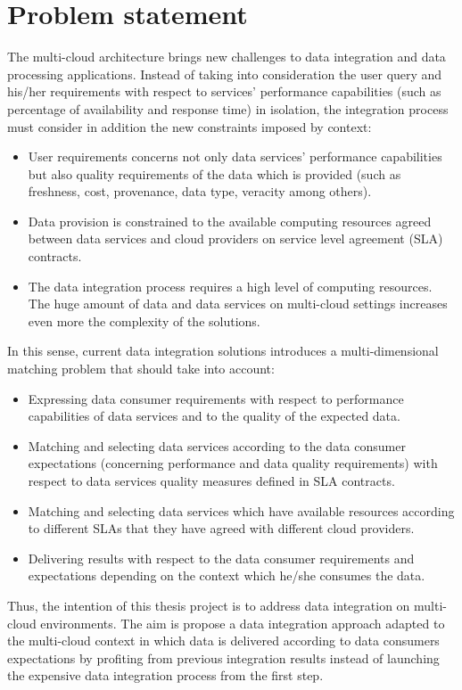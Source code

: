 \section{Problem statement}
%
The multi-cloud architecture brings new challenges to data integration
and data processing applications.
%
Instead of taking into consideration the user query and his/her requirements
with respect to services' performance capabilities (such as percentage of 
availability and response time) in isolation, the integration process 
must consider in addition the new constraints imposed by context: 
%
\begin{itemize}
\renewcommand{\labelitemi}{$-$}
\item User requirements concerns not only data services' performance 
capabilities but also quality requirements of the data which is provided
(such as freshness, cost, provenance, data type, veracity among others).
%
\item Data provision is constrained to the available computing resources agreed
between data services and cloud providers on service level agreement (SLA) contracts. 
%
\item The data integration process requires a high level of computing resources.
The huge amount of data and data services on multi-cloud settings increases even 
more the complexity of the solutions.
\end{itemize}
%
In this sense, current data integration solutions introduces a multi-dimensional 
matching problem that should take into account:
%
\begin{itemize}
\renewcommand{\labelitemi}{$-$}
\item Expressing data consumer requirements with respect to performance 
capabilities of data services and to the quality of the expected data.
%
\item Matching and selecting data services according to the data consumer expectations 
(concerning performance and data quality requirements) with respect to data 
services quality measures defined in SLA contracts. 
%
\item Matching and selecting data services which have available resources according
to different SLAs that they have agreed with different cloud providers.
%
\item Delivering results with respect to the data consumer requirements and expectations 
depending on the context which he/she consumes the data.
\end{itemize}
%
Thus, the intention of this thesis project is to address data integration on multi-cloud 
environments.
%
The aim is propose a data integration approach adapted to the multi-cloud context in 
which data is delivered according to data consumers expectations by profiting from 
previous integration results instead of launching the expensive data integration 
process from the first step. 


